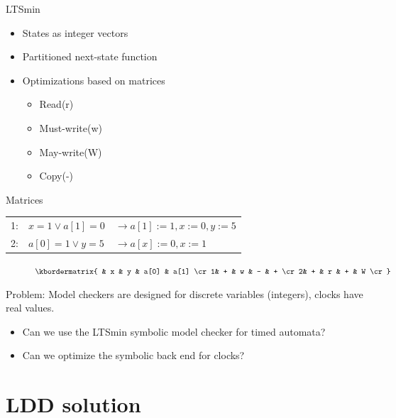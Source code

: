 \begin{frame}{LTSmin}
	\begin{itemize}
		\item States as integer vectors
	 	\item Partitioned next-state function
	 	\item Optimizations based on matrices
	 	\begin{itemize}
	 		\item Read(r)
	 		\item Must-write(w)
	 		\item May-write(W)
	 		\item Copy(-)
	 	\end{itemize}
	\end{itemize}
\end{frame}

\begin{frame}{Matrices}
\begin{center}
    \begin{tabular}{lll}
    1: & $x = 1 \vee a[1] = 0$ & $\rightarrow a[1] := 1, x:=0 , y:=5$  \\
    2: & $a[0] = 1 \vee y = 5$                     & $\rightarrow a[x] := 0, x:= 1$ \\
    \end{tabular}
\end{center}

\begin{figure}[h]
\centering
	\begin{math}
 \kbordermatrix{ 		               & x & y & a[0] & a[1] \cr
 									  1& + & w & -    & +    \cr
 									  2& + & r & +    & W    \cr}
	\end{math}
\end{figure}
\end{frame}

\begin{frame}
Problem: Model checkers are designed for discrete variables (integers), clocks have real values.
\begin{itemize}
\item Can we use the LTSmin symbolic model checker for timed automata?
\item Can we optimize the symbolic back end for clocks?
\end{itemize}
\end{frame}

\section{LDD solution}

